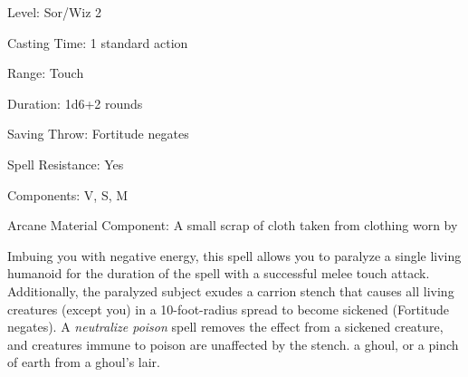 
\begin{description*}
\item[Level:] Sor/Wiz 2
\item[Casting Time:] 1 standard action
\item[Range:] Touch
\item[Duration:] 1d6+2 rounds
\item[Saving Throw:] Fortitude negates
\item[Spell Resistance:] Yes
\item[Components:] V, S, M
\item[Arcane Material Component:] A small scrap of cloth taken from clothing worn by
\end{description*}

Imbuing you with negative energy, this spell allows you to paralyze a single living
humanoid for the duration of the spell with a successful melee touch attack.
Additionally, the paralyzed subject exudes a carrion stench that causes all living
creatures (except you) in a 10-foot-radius spread to become sickened (Fortitude
negates). A \textit{neutralize poison} spell removes the effect from a sickened
creature, and creatures immune to poison are unaffected by the stench.
a ghoul, or a pinch of earth from a ghoul's lair.